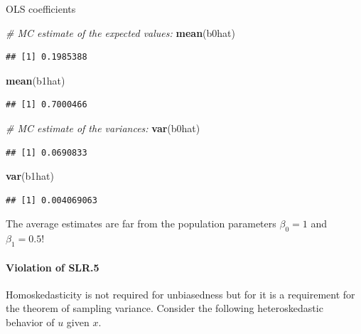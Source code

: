 \documentclass[]{book}
\newenvironment{Shaded}{\begin{snugshade}}{\end{snugshade}}
\newcommand{\CommentTok}[1]{\textcolor[rgb]{0.56,0.35,0.01}{\textit{#1}}}
\newcommand{\KeywordTok}[1]{\textcolor[rgb]{0.13,0.29,0.53}{\textbf{#1}}}
\newcommand{\NormalTok}[1]{#1}
\let\oldparagraph\paragraph
\renewcommand{\paragraph}[1]{\oldparagraph{#1}\mbox{}}
\begin{document}
OLS coefficients

\begin{Shaded}
\begin{Highlighting}[]
\CommentTok{# MC estimate of the expected values:}
\KeywordTok{mean}\NormalTok{(b0hat)}
\end{Highlighting}
\end{Shaded}

\begin{verbatim}
## [1] 0.1985388
\end{verbatim}

\begin{Shaded}
\begin{Highlighting}[]
\KeywordTok{mean}\NormalTok{(b1hat)}
\end{Highlighting}
\end{Shaded}

\begin{verbatim}
## [1] 0.7000466
\end{verbatim}

\begin{Shaded}
\begin{Highlighting}[]
\CommentTok{# MC estimate of the variances:}
\KeywordTok{var}\NormalTok{(b0hat)}
\end{Highlighting}
\end{Shaded}

\begin{verbatim}
## [1] 0.0690833
\end{verbatim}

\begin{Shaded}
\begin{Highlighting}[]
\KeywordTok{var}\NormalTok{(b1hat)}
\end{Highlighting}
\end{Shaded}

\begin{verbatim}
## [1] 0.004069063
\end{verbatim}

The average estimates are far from the population parameters
\(\beta_0=1\) and \(\beta_1 = 0.5\)!

\hypertarget{violation-of-slr.5}{%
\paragraph{Violation of SLR.5}\label{violation-of-slr.5}}

Homoskedasticity is not required for unbiasedness but for it is a
requirement for the theorem of sampling variance. Consider the following
heteroskedastic behavior of \(u\) given \(x\).
\end{document}
